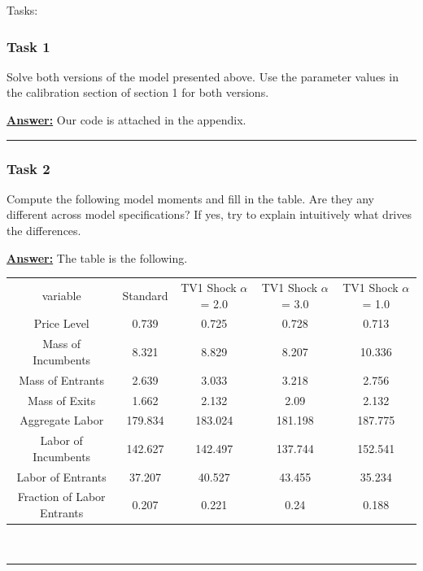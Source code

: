 \documentclass{article} %
\theoremstyle{definition}
\newenvironment{solution}[1][Answer]{\begin{singlespace}\underline{\textbf{#1:}}\quad }{\ \rule{0.3em}{0.3em}\end{singlespace}} %
\begin{document}
Tasks:
\subsubsection*{Task 1}
Solve both versions of the model presented above. Use the parameter values in the calibration section of section 1 for both versions.
\begin{solution}
Our code is attached in the appendix.
\end{solution}
\subsubsection*{Task 2}
Compute the following model moments and fill in the table. Are they any different across model specifications? If yes, try to explain intuitively what drives the differences.
\begin{solution}
	The table is the following. 
	\begin{center}
	\begin{tabular}{ccccc}
	variable & Standard & TV1 Shock $\alpha$ = 2.0 & TV1 Shock $\alpha$ = 3.0 & TV1 Shock $\alpha$ = 1.0\\
	Price Level & 0.739 & 0.725 & 0.728 & 0.713\\
	Mass of Incumbents & 8.321 & 8.829 & 8.207 & 10.336\\
	Mass of Entrants & 2.639 & 3.033 & 3.218 & 2.756\\
	Mass of Exits & 1.662 & 2.132 & 2.09 & 2.132\\
	Aggregate Labor & 179.834 & 183.024 & 181.198 & 187.775\\
	Labor of Incumbents & 142.627 & 142.497 & 137.744 & 152.541\\
	Labor of Entrants & 37.207 & 40.527 & 43.455 & 35.234\\
	Fraction of Labor Entrants & 0.207 & 0.221 & 0.24 & 0.188\\
	\end{tabular}
	\end{center}
\end{solution}
\end{document}
